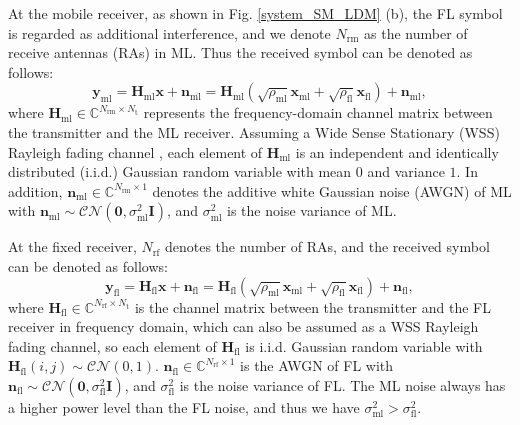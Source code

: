 \documentclass[journal]{IEEEtran}
\begin{document}
At the mobile receiver, as shown in Fig. \ref{system_SM_LDM} (b), the FL symbol is regarded as additional interference, and we denote $N_\text{rm}$ as the number of receive antennas (RAs) in ML. Thus the received symbol can be denoted as follows:
\begin{equation}
\mathbf{y}_\text{ml} = \mathbf{H}_\text{ml}\mathbf{x} + \mathbf{n}_\text{ml} = \mathbf{H}_\text{ml}\left(\sqrt{\rho_\text{ml}}\mathbf{x}_\text{ml} + \sqrt{\rho_\text{fl}}\mathbf{x}_\text{fl}\right) + \mathbf{n}_\text{ml},
\label{ML_matrix}
\end{equation}
where $\mathbf{H}_\text{ml} \in \mathbb{C}^{N_\text{rm}\times N_\text{t}}$ represents the frequency-domain channel matrix between the transmitter and the ML receiver. Assuming a Wide Sense Stationary (WSS) Rayleigh fading channel \cite{LDM_TAP}, each element of $\mathbf{H}_\text{ml}$ is an independent and identically distributed (i.i.d.) Gaussian random variable with mean $0$ and variance $1$. In addition, $\mathbf{n}_\text{ml}\in\mathbb{C}^{N_\text{rm}\times 1}$
denotes the additive white Gaussian noise (AWGN) of ML with $\mathbf{n}_\text{ml} \sim \mathcal{CN}(\mathbf{0},\sigma_\text{ml}^2\mathbf{I})$, and $\sigma_\text{ml}^2$ is the noise variance of ML.

At the fixed receiver, $N_\text{rf}$ denotes the number of RAs, and the received symbol can be denoted as follows:
\begin{equation}
\mathbf{y}_\text{fl} = \mathbf{H}_\text{fl}\mathbf{x} + \mathbf{n}_\text{fl} = \mathbf{H}_\text{fl}\left(\sqrt{\rho_\text{ml}}\mathbf{x}_\text{ml} + \sqrt{\rho_\text{fl}}\mathbf{x}_\text{fl}\right) + \mathbf{n}_\text{fl},
\end{equation}
where $\mathbf{H}_\text{fl} \in \mathbb{C}^{N_\text{rf}\times N_\text{t}}$ is the channel matrix between the transmitter and the FL receiver in frequency domain, which can also be assumed as a WSS Rayleigh fading channel, so each element of $\mathbf{H}_\text{fl}$ is i.i.d. Gaussian random variable with $\mathbf{H}_\text{fl}(i,j)\sim \mathcal{CN}(0,1)$. $\mathbf{n}_\text{fl}\in\mathbb{C}^{N_\text{rf}\times 1}$ is the AWGN of FL with $\mathbf{n}_\text{fl}\sim\mathcal{CN}(\mathbf{0},\sigma_\text{fl}^2\mathbf{I})$, and $\sigma_\text{fl}^2$ is the noise variance of FL. The ML noise always has a higher power level than the FL noise, and thus we have $\sigma_\text{ml}^2 > \sigma_\text{fl}^2$.
\end{document}
